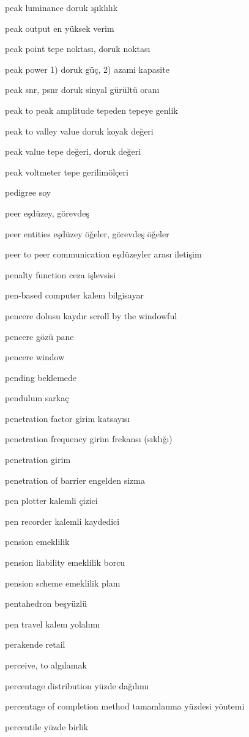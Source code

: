 \documentclass[12pt,fleqn]{article}\usepackage{../../common}
\begin{document}
peak luminance doruk ışıklılık

peak output en yüksek verim

peak point tepe noktası, doruk noktası

peak power 1) doruk güç, 2) azami kapasite

peak snr, psnr doruk sinyal gürültü oranı

peak to peak amplitude tepeden tepeye genlik

peak to valley value doruk koyak değeri

peak value tepe değeri, doruk değeri

peak voltmeter tepe gerilimölçeri

pedigree soy

peer eşdüzey, görevdeş

peer entities eşdüzey öğeler, görevdeş öğeler

peer to peer communication eşdüzeyler arası iletişim

penalty function ceza işlevsisi

pen-based computer kalem bilgisayar

pencere dolusu kaydır scroll by the windowful

pencere gözü pane

pencere window

pending beklemede

pendulum sarkaç

penetration factor girim katsayısı

penetration frequency girim frekansı (sıklığı)

penetration girim

penetration of barrier engelden sizma

pen plotter kalemli çizici

pen recorder kalemli kaydedici

pension emeklilik

pension liability emeklilik borcu

pension scheme emeklilik planı

pentahedron beşyüzlü

pen travel kalem yolalımı

perakende retail

perceive, to algılamak

percentage distribution yüzde dağılımı

percentage of completion method tamamlanma yüzdesi yöntemi

percentile yüzde birlik
\end{document}
